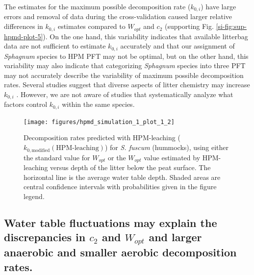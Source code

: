 \documentclass[esd, manuscript]{copernicus}
\begin{document}
The estimates for the maximum possible decomposition rate (\(k_{0,i}\)) have large errors and removal of data during the cross-validation caused larger relative differences in \(k_{0,i}\) estimates compared to \(W_{opt}\) and \(c_2\) (supporting Fig. \ref{si-fig:sup-hpmd-plot-5}). On the one hand, this variability indicates that available litterbag data are not sufficient to estimate \(k_{0,i}\) accurately and that our assignment of \emph{Sphagnum} species to HPM PFT may not be optimal, but on the other hand, this variability may also indicate that categorizing \emph{Sphagnum} species into three PFT may not accurately describe the variability of maximum possible decomposition rates. Several studies suggest that diverse aspects of litter chemistry may increase \(k_{0,i}\) \citep{Turetsky.2008, Bengtsson.2018}. However, we are not aware of studies that systematically analyze what factors control \(k_{0,i}\) within the same species.



\begin{figure}[H]

{\centering \texttt{[image: figures/hpmd\_simulation\_1\_plot\_1\_2]} 

}

\caption{Decomposition rates predicted with HPM-leaching (\(k_{0,\text{modified}}(\text{HPM-leaching})\)) for \emph{S. fuscum} (hummocks), using either the standard value for \(W_{opt}\) or the \(W_{opt}\) value estimated by HPM-leaching versus depth of the litter below the peat surface. The horizontal line is the average water table depth. Shaded areas are central confidence intervals with probabilities given in the figure legend.}\label{fig:out-sdm-parameters-standard-vs-estimated-p2}
\end{figure}

\hypertarget{out-discussion-4}{%
\subsection{\texorpdfstring{Water table fluctuations may explain the discrepancies in \(c_2\) and \(W_{opt}\) and larger anaerobic and smaller aerobic decomposition rates.}{Water table fluctuations may explain the discrepancies in c\_2 and W\_\{opt\} and larger anaerobic and smaller aerobic decomposition rates.}}\label{out-discussion-4}}
\end{document}
